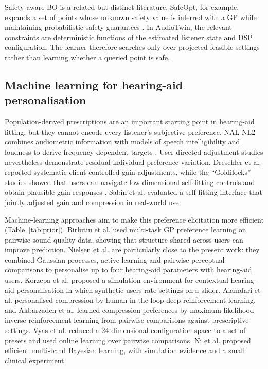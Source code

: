 \documentclass[preprint,12pt]{elsarticle}
\begin{document}
Safety-aware BO is a related but distinct literature. SafeOpt, for example, expands a set of points whose unknown safety value is inferred with a GP while maintaining probabilistic safety guarantees \cite{sui2015}. In AudioTwin, the relevant constraints are deterministic functions of the estimated listener state and DSP configuration. The learner therefore searches only over projected feasible settings rather than learning whether a queried point is safe.

\subsection{Machine learning for hearing-aid personalisation}

Population-derived prescriptions are an important starting point in hearing-aid fitting, but they cannot encode every listener's subjective preference. NAL-NL2 combines audiometric information with models of speech intelligibility and loudness to derive frequency-dependent targets \cite{keidser2011}. User-directed adjustment studies nevertheless demonstrate residual individual preference variation. Dreschler et al. \cite{dreschler2008} reported systematic client-controlled gain adjustments, while the ``Goldilocks'' studies showed that users can navigate low-dimensional self-fitting controls and obtain plausible gain responses \cite{boothroyd2017,mackersie2019}. Sabin et al. \cite{sabin2020} evaluated a self-fitting interface that jointly adjusted gain and compression in real-world use.

Machine-learning approaches aim to make this preference elicitation more efficient (Table~\ref{tab:prior}). Birlutiu et al. \cite{birlutiu2010} used multi-task GP preference learning on pairwise sound-quality data, showing that structure shared across users can improve prediction. Nielsen et al. \cite{nielsen2015} are particularly close to the present work: they combined Gaussian processes, active learning and pairwise perceptual comparisons to personalise up to four hearing-aid parameters with hearing-aid users. Korzepa et al. \cite{korzepa2020} proposed a simulation environment for contextual hearing-aid personalisation in which synthetic users rate settings on a slider. Alamdari et al. \cite{alamdari2020} personalised compression by human-in-the-loop deep reinforcement learning, and Akbarzadeh et al. \cite{akbarzadeh2022} learned compression preferences by maximum-likelihood inverse reinforcement learning from pairwise comparisons against prescriptive settings. Vyas et al. \cite{vyas2022} reduced a 24-dimensional configuration space to a set of presets and used online learning over pairwise comparisons. Ni et al. \cite{ni2024} proposed efficient multi-band Bayesian learning, with simulation evidence and a small clinical experiment.
\end{document}
